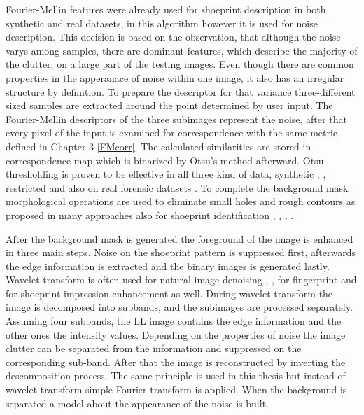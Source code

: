 \documentclass[draft,final]{vutinfth} %
\begin{document}
\par
Fourier-Mellin features were already used for shoeprint description in both synthetic \cite{gueham2008automatic} and real \cite{wu2019crime} datasets, in this algorithm however it is used for noise description.
This decision is based on the observation, that although the noise varys among samples, there are dominant features, which describe the majority of the clutter, on a large part of the testing images.
Even though there are common properties in the apperanace of noise within one image, it also has an irregular structure by definition.
To prepare the descriptor for that variance three-different sized samples are extracted around the point determined by user input.
The Fourier-Mellin descriptors of the three subimages represent the noise, after that every pixel of the input is examined for correspondence with the same metric defined in Chapter 3 \ref{FMcorr}.
The calculated similarities are stored in correspondence map which is binarized by Otsu's method afterward.
Otsu thresholding is proven to be effective in all three kind of data, synthetic \cite{algarni2008novel}, \cite{alizadeh2017automatic}, restricted \cite{kong2014novel} and also on real forensic datasets \cite{wu2019crime}.
To complete the background mask morphological operations are used to eliminate small holes and rough contours as proposed in many approaches also for shoeprint identification \cite{wang2014automatic}, \cite{kong2014novel}, \cite{li2014retrieval}, \cite{tang2010footwear}.
\par
After the background mask is generated the foreground of the image is enhanced in three main steps.
Noise on the shoeprint pattern is suppressed first, afterwards the edge information is extracted and the binary images is generated lastly.
Wavelet transform is often used for natural image denoising \cite{xu2016image}, \cite{sugamya2016image}, for fingerprint \cite{li2012texture} and for shoeprint impression enhancement \cite{katireddy2017novel} as well.
During wavelet transform the image is decomposed into subbands, and the subimages are processed separately.
Assuming four subbands, the LL image contains the edge information and the other ones the intensity values.
Depending on the properties of noise the image clutter can be separated from the information and suppressed on the corresponding sub-band.
After that the image is reconstructed by inverting the descomposition process.
The same principle is used in this thesis but instead of wavelet transform simple Fourier transform is applied.
When the background is separated a model about the appearance of the noise is built.
\end{document}
